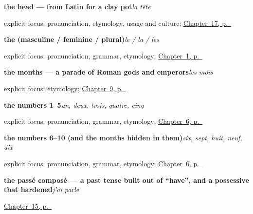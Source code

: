 \noindent\begin{minipage}[t]{\linewidth}
\raggedright
\textbf{the head — from Latin for a clay pot}\enspace\emph{la tête}\par
\footnotesize explicit focus: pronunciation, etymology, usage and culture; \hyperref[ch:fr-head-and-hand]{Chapter~17, p.~\pageref*{ch:fr-head-and-hand}}
\end{minipage}\par\smallskip

\noindent\begin{minipage}[t]{\linewidth}
\raggedright
\textbf{the (masculine / feminine / plural)}\enspace\emph{le / la / les}\par
\footnotesize explicit focus: pronunciation, grammar, etymology; \hyperref[ch:greetings]{Chapter~1, p.~\pageref*{ch:greetings}}
\end{minipage}\par\smallskip

\noindent\begin{minipage}[t]{\linewidth}
\raggedright
\textbf{the months — a parade of Roman gods and emperors}\enspace\emph{les mois}\par
\footnotesize explicit focus: etymology; \hyperref[ch:months-seasons]{Chapter~9, p.~\pageref*{ch:months-seasons}}
\end{minipage}\par\smallskip

\noindent\begin{minipage}[t]{\linewidth}
\raggedright
\textbf{the numbers 1–5}\enspace\emph{un, deux, trois, quatre, cinq}\par
\footnotesize explicit focus: pronunciation, grammar, etymology; \hyperref[ch:numbers-1-10]{Chapter~6, p.~\pageref*{ch:numbers-1-10}}
\end{minipage}\par\smallskip

\noindent\begin{minipage}[t]{\linewidth}
\raggedright
\textbf{the numbers 6–10 (and the months hidden in them)}\enspace\emph{six, sept, huit, neuf, dix}\par
\footnotesize explicit focus: pronunciation, grammar, etymology; \hyperref[ch:numbers-1-10]{Chapter~6, p.~\pageref*{ch:numbers-1-10}}
\end{minipage}\par\smallskip

\noindent\begin{minipage}[t]{\linewidth}
\raggedright
\textbf{the passé composé — a past tense built out of \textquotedblleft{}have\textquotedblright{}, and a possessive that hardened}\enspace\emph{j'ai parlé}\par
\footnotesize \hyperref[ch:passe-compose]{Chapter~15, p.~\pageref*{ch:passe-compose}}
\end{minipage}\par\smallskip

